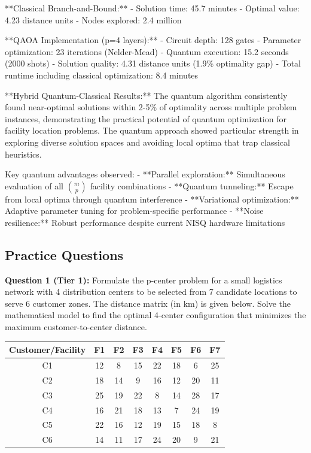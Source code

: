 \documentclass{article}
\begin{document}
**Classical Branch-and-Bound:**
- Solution time: 45.7 minutes
- Optimal value: 4.23 distance units  
- Nodes explored: 2.4 million

**QAOA Implementation (p=4 layers):**
- Circuit depth: 128 gates
- Parameter optimization: 23 iterations (Nelder-Mead)
- Quantum execution: 15.2 seconds (2000 shots)
- Solution quality: 4.31 distance units (1.9\% optimality gap)
- Total runtime including classical optimization: 8.4 minutes

**Hybrid Quantum-Classical Results:**
The quantum algorithm consistently found near-optimal solutions within 2-5\% of optimality across multiple problem instances, demonstrating the practical potential of quantum optimization for facility location problems. The quantum approach showed particular strength in exploring diverse solution spaces and avoiding local optima that trap classical heuristics.

Key quantum advantages observed:
- **Parallel exploration:** Simultaneous evaluation of all $\binom{m}{p}$ facility combinations
- **Quantum tunneling:** Escape from local optima through quantum interference  
- **Variational optimization:** Adaptive parameter tuning for problem-specific performance
- **Noise resilience:** Robust performance despite current NISQ hardware limitations

\subsection{Practice Questions}

\textbf{Question 1 (Tier 1):} 
Formulate the p-center problem for a small logistics network with 4 distribution centers to be selected from 7 candidate locations to serve 6 customer zones. The distance matrix (in km) is given below. Solve the mathematical model to find the optimal 4-center configuration that minimizes the maximum customer-to-center distance.

\begin{center}
\begin{tabular}{c|ccccccc}
Customer/Facility & F1 & F2 & F3 & F4 & F5 & F6 & F7 \\
\hline
C1 & 12 & 8 & 15 & 22 & 18 & 6 & 25 \\
C2 & 18 & 14 & 9 & 16 & 12 & 20 & 11 \\
C3 & 25 & 19 & 22 & 8 & 14 & 28 & 17 \\
C4 & 16 & 21 & 18 & 13 & 7 & 24 & 19 \\
C5 & 22 & 16 & 12 & 19 & 15 & 18 & 8 \\
C6 & 14 & 11 & 17 & 24 & 20 & 9 & 21 \\
\end{tabular}
\end{center}
\end{document}
